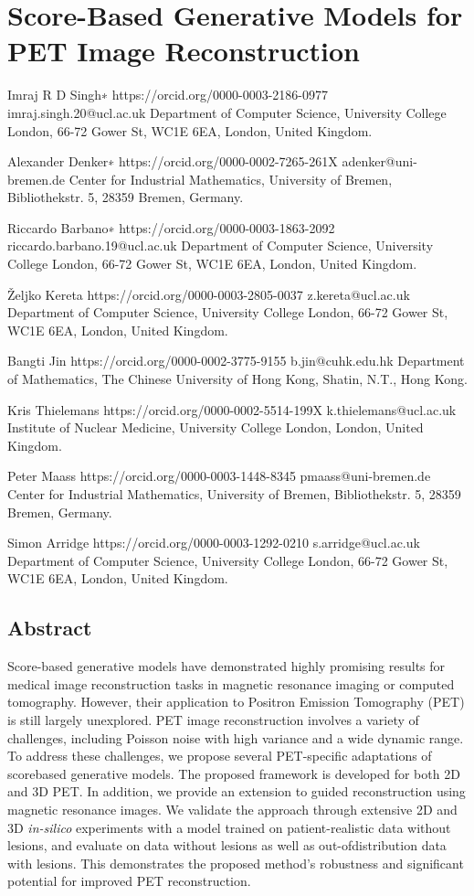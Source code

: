 \documentclass{article}
\begin{document}
\section{Score-Based Generative Models for PET Image Reconstruction}

Imraj R D Singh∗ https://orcid.org/0000-0003-2186-0977 imraj.singh.20@ucl.ac.uk Department of Computer Science, University College London, 66-72 Gower St, WC1E 6EA, London, United Kingdom.

Alexander Denker∗ https://orcid.org/0000-0002-7265-261X adenker@uni-bremen.de Center for Industrial Mathematics, University of Bremen, Bibliothekstr. 5, 28359 Bremen, Germany.

Riccardo Barbano∗ https://orcid.org/0000-0003-1863-2092 riccardo.barbano.19@ucl.ac.uk Department of Computer Science, University College London, 66-72 Gower St, WC1E 6EA, London, United Kingdom.

Željko Kereta https://orcid.org/0000-0003-2805-0037 z.kereta@ucl.ac.uk Department of Computer Science, University College London, 66-72 Gower St, WC1E 6EA, London, United Kingdom.

Bangti Jin https://orcid.org/0000-0002-3775-9155 b.jin@cuhk.edu.hk Department of Mathematics, The Chinese University of Hong Kong, Shatin, N.T., Hong Kong.

Kris Thielemans https://orcid.org/0000-0002-5514-199X k.thielemans@ucl.ac.uk Institute of Nuclear Medicine, University College London, London, United Kingdom.

Peter Maass https://orcid.org/0000-0003-1448-8345 pmaass@uni-bremen.de Center for Industrial Mathematics, University of Bremen, Bibliothekstr. 5, 28359 Bremen, Germany.

Simon Arridge https://orcid.org/0000-0003-1292-0210 s.arridge@ucl.ac.uk Department of Computer Science, University College London, 66-72 Gower St, WC1E 6EA, London, United Kingdom.

\subsection{Abstract}

Score-based generative models have demonstrated highly promising results for medical image reconstruction tasks in magnetic resonance imaging or computed tomography. However, their application to Positron Emission Tomography (PET) is still largely unexplored. PET image reconstruction involves a variety of challenges, including Poisson noise with high variance and a wide dynamic range. To address these challenges, we propose several PET-specific adaptations of scorebased generative models. The proposed framework is developed for both 2D and 3D PET. In addition, we provide an extension to guided reconstruction using magnetic resonance images. We validate the approach through extensive 2D and 3D \textit{in-silico} experiments with a model trained on patient-realistic data without lesions, and evaluate on data without lesions as well as out-ofdistribution data with lesions. This demonstrates the proposed method's robustness and significant potential for improved PET reconstruction.
\end{document}
